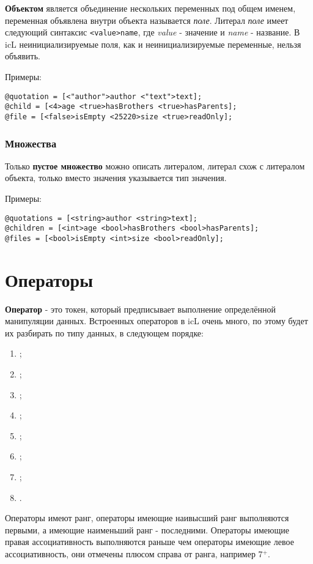 \documentclass[a4paper, 14pt]{extarticle}
\newenvironment{icEnum}
	{ \begin{enumerate}[noitemsep,nolistsep] }
	{ \end{enumerate} }
\begin{document}
{\bf Объектом} является объединение нескольких переменных под общем именем, переменная объявлена внутри объекта называется {\it поле}. Литерал {\it поле} имеет следующий синтаксис \lstinline`<value>name`, где  {\it value} - значение и {\it name} - название. В icL неинициализируемые поля, как и неинициализируемые переменные, нельзя объявить. 
	
\noindent Примеры:
\begin{lstlisting}[numbers=none]
@quotation = [<"author">author <"text">text];
@child = [<4>age <true>hasBrothers <true>hasParents];
@file = [<false>isEmpty <25220>size <true>readOnly];
\end{lstlisting}

\subsubsection{Множества}

Только {\bf пустое множество} можно описать литералом, литерал схож с литералом объекта, только вместо значения указывается тип значения.

\noindent Примеры:
\begin{lstlisting}[numbers=none]
@quotations = [<string>author <string>text];
@children = [<int>age <bool>hasBrothers <bool>hasParents];
@files = [<bool>isEmpty <int>size <bool>readOnly];
\end{lstlisting}

\newpage
\section{Операторы}

{\bf Оператор} - это токен, который предписывает выполнение определённой манипуляции данных. Встроенных операторов в icL очень много, по этому будет их разбирать по типу данных, в следующем порядке:
	
\begin{icEnum}
	\item {};
	\item {};
	\item {};
	\item {};
	\item {};
	\item {};
	\item {};
	\item {}.
\end{icEnum}

Операторы имеют ранг, операторы имеющие наивысший ранг выполняются первыми, а имеющие наименьший ранг - последними. Операторы имеющие правая ассоциативность выполняются раньше чем операторы имеющие левое ассоциативность, они отмечены плюсом справа от ранга, например 7$^+$.
	
\end{document}
